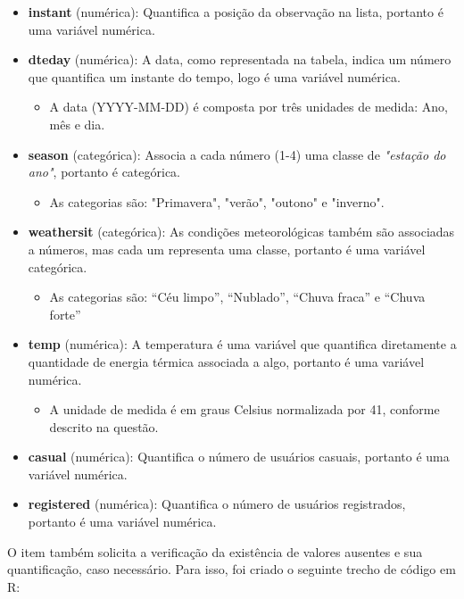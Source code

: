 \documentclass[a4paper, 12pt, titlepage]{article}
\begin{document}
\begin{itemize}
    \item \textbf{instant} (numérica): Quantifica a posição da observação na lista, portanto é uma variável numérica.
    \item \textbf{dteday} (numérica): A data, como representada na tabela, indica um número que quantifica um instante do tempo, logo é uma variável numérica.
        \begin{itemize}
            \item A data (YYYY-MM-DD) é composta por três unidades de medida: Ano, mês e dia.
        \end{itemize}
    \item \textbf{season} (categórica): Associa a cada número (1-4) uma classe de \textit{"estação do ano"}, portanto é categórica.
        \begin{itemize}
            \item As categorias são: "Primavera", "verão", "outono" e "inverno".
        \end{itemize}
    \item \textbf{weathersit} (categórica): As condições meteorológicas também são associadas a números, mas cada um representa uma classe, portanto é uma variável categórica.
        \begin{itemize}
            \item As categorias são: “Céu limpo”, “Nublado”, “Chuva fraca” e “Chuva forte”
        \end{itemize}
    \item \textbf{temp} (numérica): A temperatura é uma variável que quantifica diretamente a quantidade de energia térmica associada a algo, portanto é uma variável numérica.
        \begin{itemize}
            \item A unidade de medida é em graus Celsius normalizada por 41, conforme descrito na questão.
        \end{itemize}
    \item \textbf{casual} (numérica): Quantifica o número de usuários casuais, portanto é uma variável numérica.
    \item \textbf{registered} (numérica): Quantifica o número de usuários registrados, portanto é uma variável numérica.
\end{itemize}

O item também solicita a verificação da existência de valores ausentes e sua quantificação, caso necessário. Para isso, foi criado o seguinte trecho de código em R:
\end{document}
